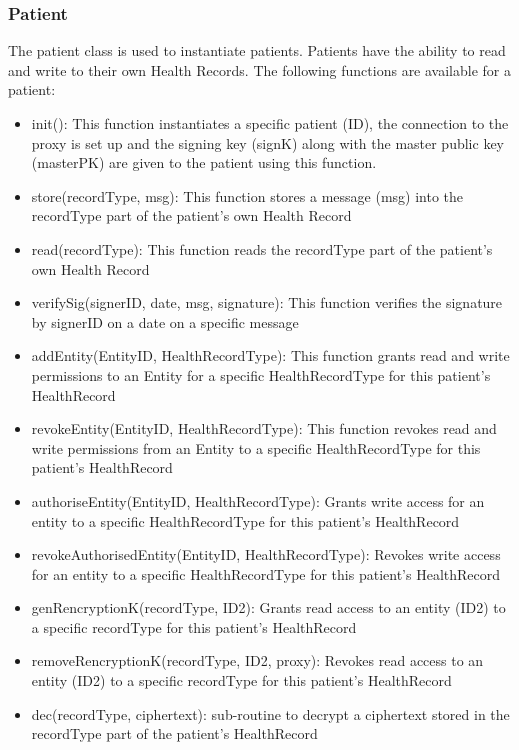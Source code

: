 \documentclass[]{article}
\begin{document}
\subsubsection{Patient}
The patient class is used to instantiate patients. Patients have the ability to read and write to their own Health Records. The following functions are available for a patient:
\begin{itemize}
\item init(): This function instantiates a specific patient (ID), the connection to the proxy is set up and the signing key (signK) along with the master public key (masterPK) are given to the patient using this function.
\item store(recordType, msg): This function stores a message (msg) into the recordType part of the patient's own Health Record
\item read(recordType): This function reads the recordType part of the patient's own Health Record
\item verifySig(signerID, date, msg, signature): This function verifies the signature by signerID on a date on a specific message
\item addEntity(EntityID, HealthRecordType): This function grants read and write permissions to an Entity for a specific HealthRecordType for this patient's HealthRecord
\item revokeEntity(EntityID, HealthRecordType): This function revokes read and write permissions from an Entity to a specific HealthRecordType for this patient's HealthRecord
\item authoriseEntity(EntityID, HealthRecordType): Grants write access for an entity to a specific HealthRecordType for this patient's HealthRecord
\item revokeAuthorisedEntity(EntityID, HealthRecordType): Revokes write access for an entity to a specific HealthRecordType for this patient's HealthRecord
\item genRencryptionK(recordType, ID2): Grants read access to an entity (ID2) to a specific recordType for this patient's HealthRecord
\item removeRencryptionK(recordType, ID2, proxy): Revokes read access to an entity (ID2) to a specific recordType for this patient's HealthRecord
\item dec(recordType, ciphertext): sub-routine to decrypt a ciphertext stored in the recordType part of the patient's HealthRecord
\end{itemize}
\end{document}
